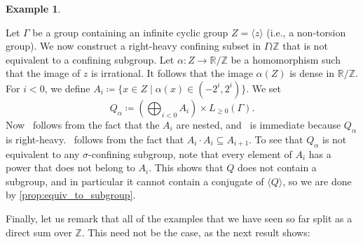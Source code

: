 \documentclass[reqno,12pt]{amsart}\setcounter{tocdepth}{1}
\theoremstyle{definition}
\newtheorem{example}[theorem]{Example}
\newcommand{\Z}{\mathbb{Z}}
\newcommand{\R}{\mathbb{R}}
\numberwithin{equation}{section}
\begin{document}
\begin{example}
\label{ex:machado}

Let $\Gamma$ be a group containing an infinite cyclic group $Z = \langle z \rangle$ (i.e., a non-torsion group). We now construct a right-heavy confining subset in $\Gamma \wr \Z$ that is not equivalent to a confining subgroup. Let $\alpha \colon Z \to \R/\Z$ be a homomorphism such that the image of $z$ is irrational. It follows that the image $\alpha(Z)$ is dense in $\R/\Z$. For $i < 0$, we define $A_i \coloneqq \{ x \in Z \mid \alpha(x) \in (-2^i, 2^i) \}$. We set
\[
Q_\alpha \coloneqq \left(\bigoplus_{i < 0} A_i\right) \times L_{\geq 0}(\Gamma).
\]
Now \StayInConf\ follows from the fact that the $A_i$ are nested, and \GetInConf\ is immediate because $Q_\alpha$ is right-heavy. \ProdConf\ follows from the fact that $A_i \cdot A_i \subseteq A_{i+1}$. To see that $Q_\alpha$ is not equivalent to any $\sigma$-confining subgroup, note that every element of $A_i$ has a power that does not belong to $A_i$. This shows that $Q$ does not contain a subgroup, and in particular it cannot contain a conjugate of $\langle Q \rangle$, so we are done by \cref{prop:equiv_to_subgroup}.
\end{example}

Finally, let us remark that all of the examples that we have seen so far split as a direct sum over $\Z$. This need not be the case, as the next result shows:
\end{document}
